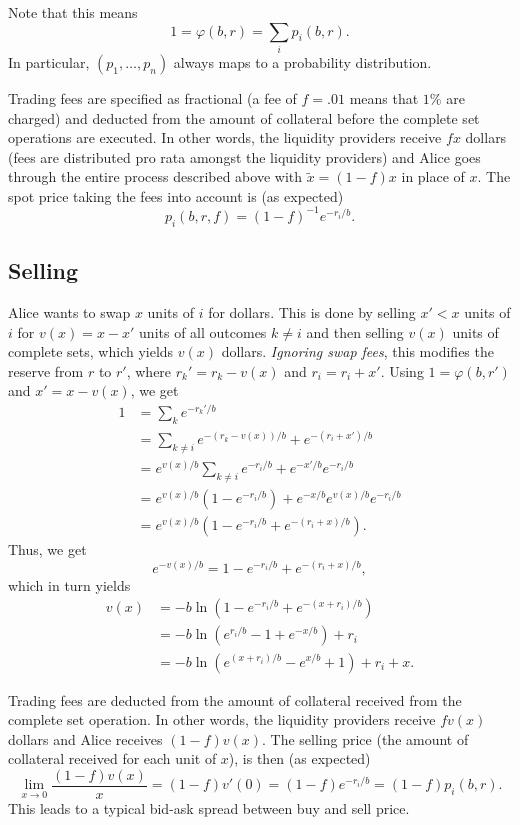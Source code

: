 \documentclass[12pt]{article}
\begin{document}
Note that this means
\[
    1 = \varphi(b, r) = \sum_i p_i(b, r).
\]
In particular, $(p_1, \ldots, p_n)$ always maps to a probability distribution.

Trading fees are specified as fractional (a fee of $f = .01$ means that $1\%$ are charged) and deducted from the amount of collateral before the complete set operations are executed. In other words, the liquidity providers receive $fx$ dollars (fees are distributed pro rata amongst the liquidity providers) and Alice goes through the entire process described above with $\tilde x = (1-f)x$ in place of $x$. The spot price taking the fees into account is (as expected)
\[
    p_i(b, r, f) = (1 - f)^{-1}e^{-r_i/b}.
\]

\subsection{Selling}

Alice wants to swap $x$ units of $i$ for dollars. This is done by selling $x' < x$ units of $i$ for $v(x) = x - x'$ units of all outcomes $k \neq i$ and then selling $v(x)$ units of complete sets, which yields $v(x)$ dollars. \emph{Ignoring swap fees}, this modifies the reserve from $r$ to $r'$, where $r_k' = r_k - v(x)$ and $r_i = r_i + x'$. Using $1 = \varphi(b, r')$ and $x' = x - v(x)$, we get
\begin{align*}
    1 &= \sum_k e^{-r_k'/b} \\
    &= \sum_{k \neq i} e^{-(r_k - v(x))/b} + e^{-(r_i + x')/b} \\
    &= e^{v(x)/b} \sum_{k \neq i} e^{-r_i/b} + e^{-x'/b} e^{-r_i/b} \\
    &= e^{v(x)/b} (1 - e^{-r_i/b}) + e^{-x/b} e^{v(x)/b} e^{-r_i/b} \\
    &= e^{v(x)/b} ( 1 - e^{-r_i/b} + e^{-(r_i + x)/b} ).
\end{align*}
Thus, we get
$$
    e^{-v(x)/b} = 1 - e^{-r_i/b} + e^{-(r_i + x)/b},
$$
which in turn yields                                                                                   \begin{align*}
    v(x) &= - b \ln (1 - e^{-r_i/b} + e^{-(x+r_i)/b}) \\
    &= -b \ln (e^{r_i/b} - 1 + e^{-x/b}) + r_i \\                                                          &= -b \ln (e^{(x + r_i)/b} - e^{x/b} + 1) + r_i + x.
\end{align*}

Trading fees are deducted from the amount of collateral received from the complete set operation. In other words, the liquidity providers receive $fv(x)$ dollars and Alice receives $(1-f)v(x)$. The selling price (the amount of collateral received for each unit of $x$), is then (as expected)
\[
    \lim_{x \rightarrow 0} \frac{(1-f)v(x)}{x} = (1-f) v'(0) = (1-f) e^{-r_i/b} = (1-f)p_i(b, r).
\]
This leads to a typical bid-ask spread between buy and sell price.
\end{document}
